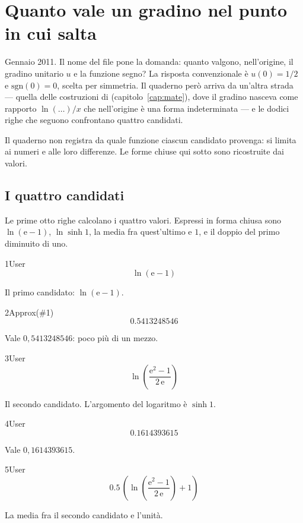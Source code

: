 \chapter{Quanto vale un gradino nel punto in cui salta}
\label{cap:u0-sign0}

Gennaio 2011. Il nome del file pone la domanda: quanto valgono, nell'origine, il gradino unitario $u$ e la funzione segno? La risposta convenzionale è $u(0)=1/2$ e $\mathrm{sgn}(0)=0$, scelta per simmetria. Il quaderno però arriva da un'altra strada — quella delle costruzioni di  (capitolo~\ref{cap:mate}), dove il gradino nasceva come rapporto $\ln\!\left(\ldots\right)/x$ che nell'origine è una forma indeterminata — e le dodici righe che seguono confrontano quattro candidati.

Il quaderno non registra da quale funzione ciascun candidato provenga: si limita ai numeri e alle loro differenze. Le forme chiuse qui sotto sono ricostruite dai valori.

\section{I quattro candidati}

Le prime otto righe calcolano i quattro valori. Espressi in forma chiusa sono $\ln(\mathrm{e}-1)$, $\ln\sinh 1$, la media fra quest'ultimo e $1$, e il doppio del primo diminuito di uno.

\begin{espr}{1}{User}{}
\[
\ln\!\left(\mathrm{e} - 1\right)
\]
\end{espr}
Il primo candidato: $\ln(\mathrm{e}-1)$.

\begin{espr}{2}{Approx(\#1)}{}
\[
0.5413248546
\]
\end{espr}
Vale $0{,}5413248546$: poco più di un mezzo.

\begin{espr}{3}{User}{}
\[
\ln\!\left(\frac{\mathrm{e}^{2} - 1}{2\, \mathrm{e}}\right)
\]
\end{espr}
Il secondo candidato. L'argomento del logaritmo è $\sinh 1$.

\begin{espr}{4}{User}{}
\[
0.1614393615
\]
\end{espr}
Vale $0{,}1614393615$.

\begin{espr}{5}{User}{}
\[
0.5\, \left(\ln\!\left(\frac{\mathrm{e}^{2} - 1}{2\, \mathrm{e}}\right) + 1\right)
\]
\end{espr}
La media fra il secondo candidato e l'unità.


